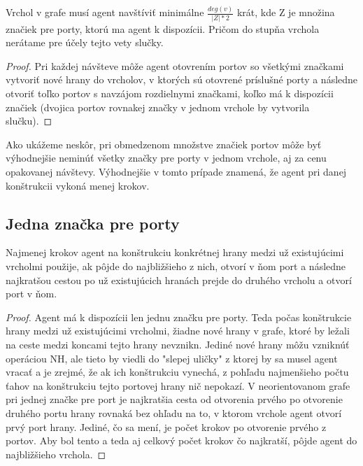 \begin{lem}
Vrchol v grafe musí agent navštíviť minimálne $\frac{deg(v)}{|Z| * 2} $ krát,
 kde Z je množina značiek pre porty, ktorú ma agent k dispozícii. Pričom do
stupňa vrchola nerátame pre účely tejto vety slučky.
\end{lem}
\begin{proof}
Pri každej návšteve môže agent otovrením portov so všetkými značkami 
vytvoriť nové hrany do vrcholov, v ktorých sú otovrené príslušné porty 
a následne otvoriť toľko
portov s navzájom rozdielnymi značkami, koľko má k dispozícii značiek
(dvojica portov rovnakej značky v jednom vrchole by vytvorila slučku).
\end{proof}
\begin{pozn}
Ako ukážeme neskôr, pri obmedzenom množstve značiek portov môže byť
výhodnejšie neminúť všetky značky pre porty v jednom vrchole, aj za cenu
opakovanej návštevy. Výhodnejšie v tomto prípade znamená, že agent pri danej
konštrukcii vykoná menej krokov.
\end{pozn}


\subsection{Jedna značka pre porty}

\begin{lem}
Najmenej krokov agent na konštrukciu konkrétnej hrany medzi už existujúcimi
vrcholmi použije, ak pôjde do najbližšieho z nich, otvorí v ňom port a
následne najkratšou cestou po už existujúcich hranách prejde do druhého
vrcholu a otvorí port v ňom.
\end{lem}
\begin{proof}
Agent má k dispozícii len jednu značku pre porty. Teda počas konštrukcie
hrany medzi už existujúcimi vrcholmi, žiadne nové hrany v grafe,
 ktoré by ležali na ceste medzi koncami tejto hrany nevznikn.
 Jediné nové hrany môžu vzniknúť operáciou NH, ale
tieto by viedli do "slepej uličky" z ktorej by sa musel agent vracať a je
zrejmé, že ak ich konštrukciu vynechá, z pohľadu najmenšieho počtu ťahov na
konštrukciu tejto portovej hrany nič nepokazí. V neorientovanom grafe
pri jednej značke pre port je najkratšia cesta od otvorenia prvého po
otvorenie druhého portu hrany rovnaká bez ohľadu na to, 
v ktorom vrchole agent otvorí prvý port hrany.
Jediné, čo sa mení, je počet krokov po otvorenie prvého z portov.
Aby bol tento a teda aj celkový počet krokov čo najkratší, pôjde agent do
najbližšieho vrchola.
\end{proof}

